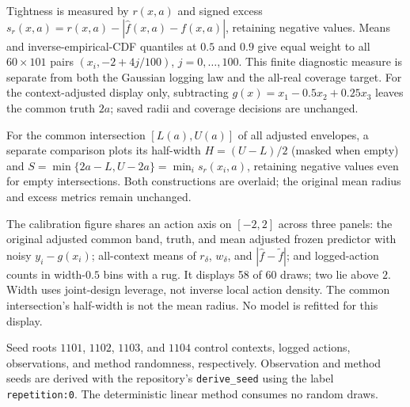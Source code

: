 \documentclass[11pt]{article}
\begin{document}
Tightness is measured by $r(x,a)$ and signed excess
$s_r(x,a)=r(x,a)-|\widehat f(x,a)-f(x,a)|$, retaining negative values.
Means and inverse-empirical-CDF quantiles at $0.5$ and $0.9$ give equal weight
to all $60\times101$ pairs $(x_i,-2+4j/100)$, $j=0,\ldots,100$.
This finite diagnostic measure is separate from both the Gaussian logging
law and the all-real coverage target. For the context-adjusted display only,
subtracting $g(x)=x_1-0.5x_2+0.25x_3$ leaves the common truth $2a$;
saved radii and coverage decisions are unchanged.

For the common intersection $[L(a),U(a)]$ of all adjusted envelopes, a separate
comparison plots its half-width $H=(U-L)/2$ (masked when empty) and
$S=\min\{2a-L,U-2a\}=\min_i s_r(x_i,a)$, retaining negative values even
for empty intersections. Both constructions are overlaid; the original mean
radius and excess metrics remain unchanged.

The calibration figure shares an action axis on $[-2,2]$ across three panels:
the original adjusted common band, truth, and mean adjusted frozen predictor
with noisy $y_i-g(x_i)$;
all-context means of $r_\delta$, $w_\delta$, and
$|\widehat f-\widetilde f|$; and logged-action counts in width-$0.5$ bins
with a rug. It displays 58 of 60 draws; two lie above $2$. Width uses joint-design
leverage, not inverse local action density. The common intersection's half-width
is not the mean radius. No model is refitted for this display.

Seed roots $1101$, $1102$, $1103$, and $1104$ control contexts, logged actions,
observations, and method randomness, respectively. Observation and method
seeds are derived with the repository's \texttt{derive\_seed} using the label
\texttt{repetition:0}. The deterministic linear method consumes no random draws.
\end{document}
